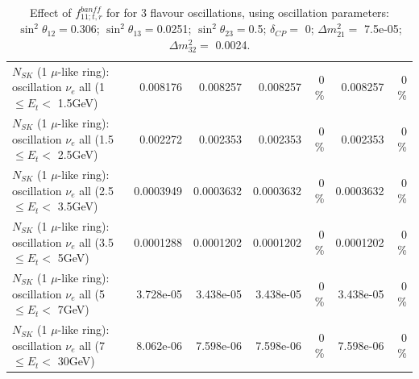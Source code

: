 \begin{table}
\begin{tabular}{| l | r | r | r  r | r  r |}
$N_{SK}$ (1 $\mu$-like ring): oscillation $\nu_{e}$ all (1 $\leq E_{t} <$ 1.5GeV) &        0.008176 &        0.008257 &        0.008257 &        0 \%  &        0.008257 &        0 \%  \\ 
$N_{SK}$ (1 $\mu$-like ring): oscillation $\nu_{e}$ all (1.5 $\leq E_{t} <$ 2.5GeV) &        0.002272 &        0.002353 &        0.002353 &        0 \%  &        0.002353 &        0 \%  \\ 
$N_{SK}$ (1 $\mu$-like ring): oscillation $\nu_{e}$ all (2.5 $\leq E_{t} <$ 3.5GeV) &       0.0003949 &       0.0003632 &       0.0003632 &        0 \%  &       0.0003632 &        0 \%  \\ 
$N_{SK}$ (1 $\mu$-like ring): oscillation $\nu_{e}$ all (3.5 $\leq E_{t} <$ 5GeV) &       0.0001288 &       0.0001202 &       0.0001202 &        0 \%  &       0.0001202 &        0 \%  \\ 
 $N_{SK}$ (1 $\mu$-like ring): oscillation $\nu_{e}$ all (5 $\leq E_{t} <$ 7GeV) &       3.728e-05 &       3.438e-05 &       3.438e-05 &        0 \%  &       3.438e-05 &        0 \%  \\ 
$N_{SK}$ (1 $\mu$-like ring): oscillation $\nu_{e}$ all (7 $\leq E_{t} <$ 30GeV) &       8.062e-06 &       7.598e-06 &       7.598e-06 &        0 \%  &       7.598e-06 &        0 \%  \\ 
\hline
\hline
\end{tabular}
\caption{ Effect of $f_{11; t, r}^{banff}$ for for 3 flavour oscillations, using oscillation parameters:  $\sin^2\theta_{12} = $0.306; $\sin^2\theta_{13} = $0.0251; $\sin^2\theta_{23} = $0.5; $\delta_{CP} = $        0; $\Delta m^2_{21} = $    7.5e-05; $\Delta m^2_{32} = $    0.0024. }
\label{tab:num_banff_11_1RmuT_3f_osc_t13:0.0251}
\end{table}
\clearpage
